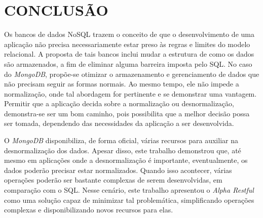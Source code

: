 \chapter{CONCLUSÃO}
\label{Conclusao}

Os bancos de dados NoSQL trazem o conceito de que o desenvolvimento de uma aplicação não precisa necessariamente estar preso às regras e limites do modelo relacional. A proposta de tais bancos inclui mudar a estrutura de como os dados são armazenados, a fim de eliminar alguma barreira imposta pelo SQL. No caso do \textit{MongoDB}, propõe-se otimizar o armazenamento e gerenciamento de dados que não precisam seguir as formas normais. Ao mesmo tempo, ele não impede a normalização, onde tal abordagem for pertinente e se demonstrar uma vantagem. Permitir que a aplicação decida sobre a normalização ou desnormalização, demonstra-se ser um bom caminho, pois possibilita que a melhor decisão possa ser tomada, dependendo das necessidades da aplicação a ser desenvolvida.

O \textit{MongoDB} disponibiliza, de forma oficial, várias recursos para auxiliar na desnormalização dos dados. Apesar disso, este trabalho demonstrou que, até mesmo em aplicações onde a desnormalização é importante, eventualmente, os dados poderão precisar estar normalizados. Quando isso acontecer, várias operações poderão ser bastante complexas de serem desenvolvidas, em comparação com o SQL. Nesse cenário, este trabalho apresentou o \textit{Alpha Restful} como uma solução capaz de minimizar tal problemática, simplificando operações complexas e disponibilizando novos recursos para elas.



